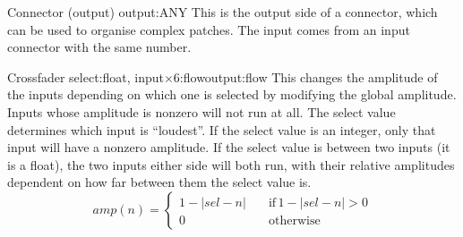 {Connector (output)}
{output:ANY}{}
This is the output side of a connector, which can be used to
organise complex patches. The input comes from an input
connector with the same number.

\clearpage
{}
{Crossfader}
{select:float, input$\times$6:flow}{output:flow}
This changes the amplitude of the inputs depending on which one
is selected by modifying the global amplitude. 
Inputs whose amplitude is nonzero will not run at all.
The select value determines which input is ``loudest''.
If the select value is an integer, only that input
will have a nonzero amplitude. If the select value is between
two inputs (it is a float), the two inputs either side will both
run, with their relative amplitudes dependent on how far between
them the select value is.
\[
amp(n) = \begin{cases}
1-|sel-n| & \quad\mathrm{if}\, 1-|sel-n|>0\\
0 & \quad\mathrm{otherwise}
\end{cases}
\]

